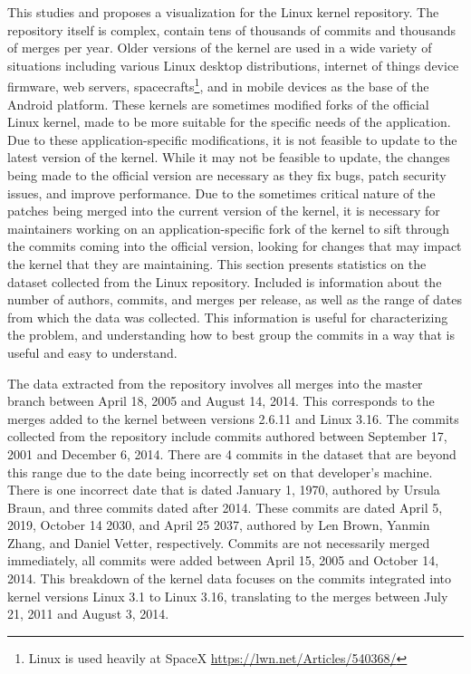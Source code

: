 This \paper{} studies and proposes a visualization for the Linux kernel
repository.
The repository itself is complex, contain tens of thousands of commits
and thousands of merges per year.
Older versions of the kernel are used in a wide
variety of situations including various Linux desktop distributions,
internet of things device firmware, web servers,
spacecrafts\footnote{Linux is used heavily at SpaceX
  \url{https://lwn.net/Articles/540368/}}, and in mobile devices as the
base of the Android platform. These kernels are sometimes modified forks
of the official Linux kernel, made to be more suitable for the specific
needs of the application. Due to these application-specific
modifications, it is not feasible to update to the latest version of the
kernel. While it may not be feasible to update, the changes being made
to the official version are necessary as they fix bugs, patch security
issues, and improve performance. Due to the sometimes critical nature of
the patches being merged into the current version of the kernel, it is
necessary for maintainers working on an application-specific fork of the
kernel to sift through the commits coming into the official version,
looking for changes that may impact the kernel that they are
maintaining.
This section presents statistics on the dataset collected from the Linux
repository. Included is information about the number of authors,
commits, and merges per release, as well as the range of dates from
which the data was collected. This information is useful for
characterizing the problem, and understanding how to best group the
commits in a way that is useful and easy to understand.

The data extracted from the repository involves all merges into the
master branch between April 18, 2005 and August 14, 2014. This
corresponds to the merges added to the kernel between versions 2.6.11
and Linux 3.16.
The commits collected from the repository include commits authored
between September 17, 2001 and December 6, 2014.
There are 4 commits in the dataset that are beyond this range due to
the date being incorrectly set on that developer's machine.
There is one incorrect date that is dated January 1, 1970, authored by
Ursula Braun, and three commits dated after 2014.
These commits are dated April 5, 2019, October 14 2030, and
April 25 2037, authored by Len Brown, Yanmin Zhang, and Daniel Vetter,
respectively.
Commits are not necessarily merged immediately, all commits were added
between April 15, 2005 and October 14, 2014.
This breakdown of the kernel data focuses on the commits integrated
into kernel versions Linux 3.1 to Linux 3.16, translating to the merges
between July 21, 2011 and August 3, 2014.

